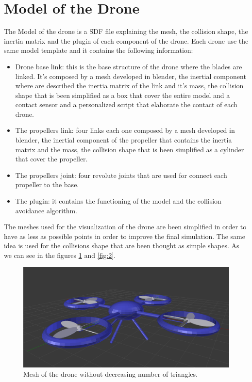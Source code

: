 \documentclass[11pt,twocolumn]{article}
\begin{document}
\section{Model of the Drone}
The Model of the drone is a SDF file explaining the mesh, the collision shape, the inertia matrix and the plugin of each component of the drone. Each drone use the same model template and it contains the following information:
\begin{itemize}[noitemsep,nolistsep]
  \item Drone base link: this is the base structure of the drone where the blades are linked. It's composed by a mesh developed in blender, the inertial component where are described the inertia matrix of the link and it's mass, the collision shape that is been simplified as a box that cover the entire model and a contact sensor and a personalized script that elaborate the contact of each drone. 
  \item The propellers link: four links each one composed by a mesh developed in blender, the inertial component of the propeller that contains the inertia matrix and the mass, the collision shape that is been simplified as a cylinder that cover the propeller.
  \item The propellers joint: four revolute joints that are used for connect each propeller to the base.
  \item The plugin: it contains the functioning of the model and the collision avoidance algorithm.  
\newline 
\end{itemize}
The meshes used for the visualization of the drone are been simplified in order to have as less as possible points in order to improve the final simulation. The same idea is used for the collisions shape that are been thought as simple shapes.
As we can see in the figures \ref{fig:1} and \ref{fig:2}. 

\begin{figure}
\centering
\includegraphics[scale=0.12]{drone.png}
\caption{Mesh of the drone without decreasing number of triangles. }
\label{fig:1}
\end{figure}
\end{document}
